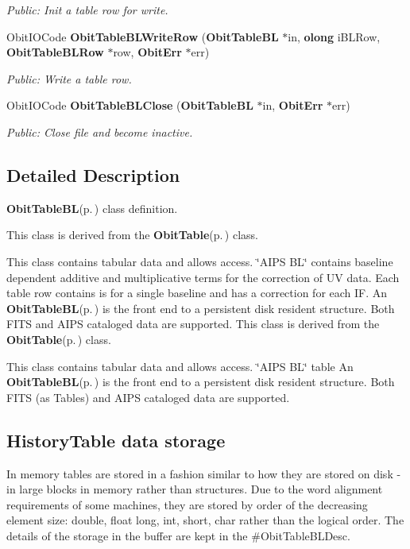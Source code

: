 \begin{CompactItemize}
\begin{CompactList}\small\item\em Public: Init a table row for write. \item\end{CompactList}\item 
Obit\-IOCode {\bf Obit\-Table\-BLWrite\-Row} ({\bf Obit\-Table\-BL} $\ast$in, {\bf olong} i\-BLRow, {\bf Obit\-Table\-BLRow} $\ast$row, {\bf Obit\-Err} $\ast$err)
\begin{CompactList}\small\item\em Public: Write a table row. \item\end{CompactList}\item 
Obit\-IOCode {\bf Obit\-Table\-BLClose} ({\bf Obit\-Table\-BL} $\ast$in, {\bf Obit\-Err} $\ast$err)
\begin{CompactList}\small\item\em Public: Close file and become inactive. \item\end{CompactList}\end{CompactItemize}


\subsection{Detailed Description}
{\bf Obit\-Table\-BL}{\rm (p.\,\pageref{structObitTableBL})} class definition. 

This class is derived from the {\bf Obit\-Table}{\rm (p.\,\pageref{structObitTable})} class.

This class contains tabular data and allows access. \char`\"{}AIPS BL\char`\"{} contains baseline dependent additive and multiplicative terms for the correction of UV data. Each table row contains is for a single baseline and has a correction for each IF. An {\bf Obit\-Table\-BL}{\rm (p.\,\pageref{structObitTableBL})} is the front end to a persistent disk resident structure. Both FITS and AIPS cataloged data are supported. This class is derived from the {\bf Obit\-Table}{\rm (p.\,\pageref{structObitTable})} class.

This class contains tabular data and allows access. \char`\"{}AIPS BL\char`\"{} table An {\bf Obit\-Table\-BL}{\rm (p.\,\pageref{structObitTableBL})} is the front end to a persistent disk resident structure. Both FITS (as Tables) and AIPS cataloged data are supported.\subsection{History\-Table data storage}\label{ObitTableWX_8h_TableDataStorage}
In memory tables are stored in a fashion similar to how they are stored on disk - in large blocks in memory rather than structures. Due to the word alignment requirements of some machines, they are stored by order of the decreasing element size: double, float long, int, short, char rather than the logical order. The details of the storage in the buffer are kept in the \#Obit\-Table\-BLDesc.

